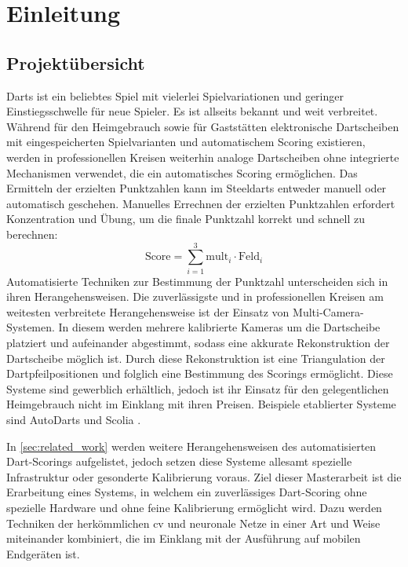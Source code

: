 
\chapter{Einleitung}
\label{cha:einleitung}



\section{Projektübersicht}
\label{sec:projektuebersicht}

Darts ist ein beliebtes Spiel mit vielerlei Spielvariationen und geringer Einstiegsschwelle für neue Spieler. Es ist allseits bekannt und weit verbreitet. Während für den Heimgebrauch sowie für Gaststätten elektronische Dartscheiben mit eingespeicherten Spielvarianten und automatischem Scoring existieren, werden in professionellen Kreisen weiterhin analoge Dartscheiben ohne integrierte Mechanismen verwendet, die ein automatisches Scoring ermöglichen. Das Ermitteln der erzielten Punktzahlen kann im Steeldarts entweder manuell oder automatisch geschehen. Manuelles Errechnen der erzielten Punktzahlen erfordert Konzentration und Übung, um die finale Punktzahl korrekt und schnell zu berechnen:
\[ \text{Score} = \sum_{i=1}^{3} \text{mult}_i \cdot \text{Feld}_i \]
Automatisierte Techniken zur Bestimmung der Punktzahl unterscheiden sich in ihren Herangehensweisen. Die zuverlässigste und in professionellen Kreisen am weitesten verbreitete Herangehensweise ist der Einsatz von Multi-Camera-Systemen. In diesem werden mehrere kalibrierte Kameras um die Dartscheibe platziert und aufeinander abgestimmt, sodass eine akkurate Rekonstruktion der Dartscheibe möglich ist. Durch diese Rekonstruktion ist eine Triangulation der Dartpfeilpositionen und folglich eine Bestimmung des Scorings ermöglicht. Diese Systeme sind gewerblich erhältlich, jedoch ist ihr Einsatz für den gelegentlichen Heimgebrauch nicht im Einklang mit ihren Preisen. Beispiele etablierter Systeme sind AutoDarts \cite{autodarts} und Scolia \cite{scoliadarts}.

In \autoref{sec:related_work} werden weitere Herangehensweisen des automatisierten Dart-Scorings aufgelistet, jedoch setzen diese Systeme allesamt spezielle Infrastruktur oder gesonderte Kalibrierung voraus. Ziel dieser Masterarbeit ist die Erarbeitung eines Systems, in welchem ein zuverlässiges Dart-Scoring ohne spezielle Hardware und ohne feine Kalibrierung ermöglicht wird. Dazu werden Techniken der herkömmlichen \ac{cv} und neuronale Netze in einer Art und Weise miteinander kombiniert, die im Einklang mit der Ausführung auf mobilen Endgeräten ist.


